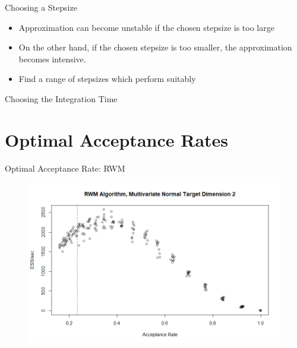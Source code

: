 \documentclass{beamer}
\begin{document}
\begin{frame}{Choosing a Stepsize}

\begin{itemize}
\item Approximation can become unstable if the chosen stepsize is too large

\item On the other hand,  if the chosen stepsize is too smaller, the approximation becomes intensive.

\item Find a range of stepsizes which perform suitably
\end{itemize}

\end{frame}


\begin{frame}{Choosing the Integration Time}


\end{frame}

\section{Optimal Acceptance Rates}

\begin{frame}{Optimal Acceptance Rate: RWM}

\begin{figure}
\centering
\includegraphics[scale = 0.4]{RWM_Optimal2.png}
\end{figure}

\end{frame}
\end{document}
